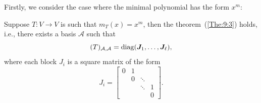 Firstly, we consider the case where the minimal polynomial has the form $x^m$:
\begin{proposition}\label{pro:9:5}
Suppose $T:V\to V$ is such that $m_T(x) = x^m$, then the theorem~(\ref{The:9:3}) holds, i.e., there exists a basis $\mathcal{A}$ such that
\[
(T)_{\mathcal{A},\mathcal{A}}=\operatorname{diag}(\bm J_1,\dots,\bm J_{\ell}),
\]
where each block $J_i$ is a square matrix of the form
\[
J_{i}
=
\begin{bmatrix}
0& 1            & \;     & \;  \\
\;        & 0    & \ddots & \;  \\
\;        & \;           & \ddots & 1   \\
\;        & \;           & \;     &0
\end{bmatrix}.
\]
\end{proposition}
